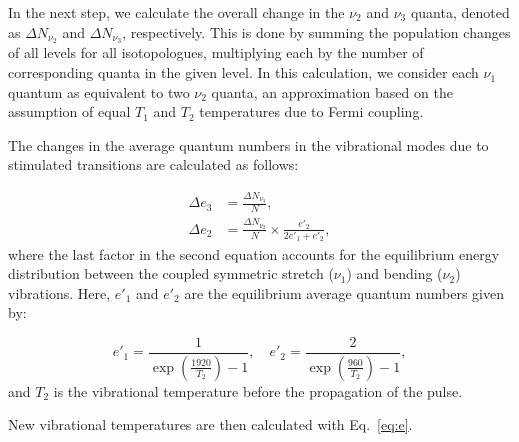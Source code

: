In the next step, we calculate the overall change in the $\nu_2$ and $\nu_3$ quanta, denoted as $\Delta N_{\nu_2}$ and $\Delta N_{\nu_3}$, respectively. This is done by summing the population changes of all levels for all isotopologues, multiplying each by the number of corresponding quanta in the given level. In this calculation, we consider each $\nu_1$ quantum as equivalent to two $\nu_2$ quanta, an approximation based on the assumption of equal $T_1$ and $T_2$ temperatures due to Fermi coupling.

The changes in the average quantum numbers in the vibrational modes due to stimulated transitions are calculated as follows:

\begin{equation}\label{eq:Deltae}
\begin{aligned}
\Delta e_3 &= \frac{\Delta N_{\nu_3}}{N}, \\
\Delta e_2 &= \frac{\Delta N_{\nu_2}}{N} \times \frac{e'_2}{2 e'_1 + e'_2},
\end{aligned}
\end{equation}
where the last factor in the second equation accounts for the equilibrium energy distribution between the coupled symmetric stretch ($\nu_1$) and bending ($\nu_2$) vibrations. Here, $e'_1$ and $e'_2$ are the equilibrium average quantum numbers given by:

\[
e'_1 = \frac{1}{\exp\left( \frac{1920}{T_2} \right) - 1}, \quad e'_2 = \frac{2}{\exp\left( \frac{960}{T_2} \right) - 1},
\]
and $T_2$ is the vibrational temperature before the propagation of the pulse.

New vibrational temperatures are then calculated with Eq.~\ref{eq:e}.
